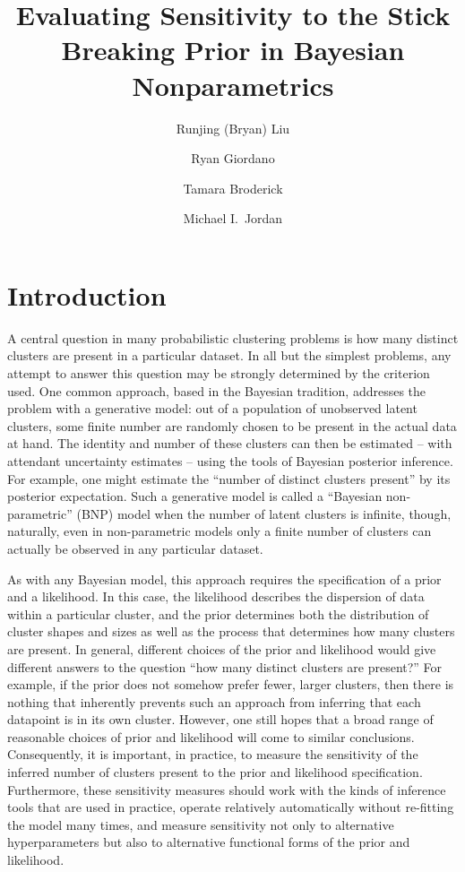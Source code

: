 \documentclass{article}
\title{Evaluating Sensitivity to the Stick Breaking Prior in Bayesian Nonparametrics}
\author[1*]{Runjing (Bryan) Liu}
\author[1*]{Ryan Giordano}
\author[2]{Tamara Broderick}
\author[1]{Michael I.~Jordan}
\affil[*]{These authors contributed equally}
\affil[1]{UC Berkeley}
\affil[2]{MIT}
\begin{document}
\maketitle

\section{Introduction}
%
A central question in many probabilistic clustering problems is how many
distinct clusters are present in a particular dataset. In all but the simplest
problems, any attempt to answer this question may be strongly determined by the
criterion used. One common approach, based in the Bayesian tradition, addresses
the problem with a generative model: out of a population of unobserved latent
clusters, some finite number are randomly chosen to be present in the actual
data at hand. The identity and number of these clusters can then be estimated –
with attendant uncertainty estimates – using the tools of Bayesian posterior
inference. For example, one might estimate the “number of distinct clusters
present” by its posterior expectation. Such a generative model is called a
“Bayesian non-parametric” (BNP) model when the number of latent clusters is
infinite, though, naturally, even in non-parametric models only a finite number
of clusters can actually be observed in any particular dataset.

As with any Bayesian model, this approach requires the specification of a prior
and a likelihood. In this case, the likelihood describes the dispersion of data
within a particular cluster, and the prior determines both the distribution of
cluster shapes and sizes as well as the process that determines how many
clusters are present. In general, different choices of the prior and likelihood
would give different answers to the question “how many distinct clusters are
present?” For example, if the prior does not somehow prefer fewer, larger
clusters, then there is nothing that inherently prevents such an approach from
inferring that each datapoint is in its own cluster. However, one still hopes
that a broad range of reasonable choices of prior and likelihood will come to
similar conclusions. Consequently, it is important, in practice, to measure the
sensitivity of the inferred number of clusters present to the prior and
likelihood specification. Furthermore, these sensitivity measures should work
with the kinds of inference tools that are used in practice, operate relatively
automatically without re-fitting the model many times, and measure sensitivity
not only to alternative hyperparameters but also to alternative functional forms
of the prior and likelihood.
\end{document}
